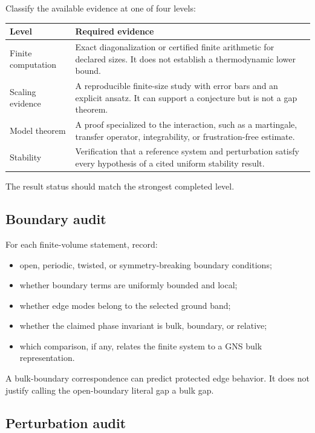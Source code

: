 \documentclass[12pt]{article}
\theoremstyle{definition}
\theoremstyle{remark}
\begin{document}
Classify the available evidence at one of four levels:

\begin{center}
\begin{tabular}{p{}p{}}
\toprule
Level & Required evidence \\
\midrule
Finite computation
& Exact diagonalization or certified finite arithmetic for declared sizes. It
does not establish a thermodynamic lower bound.\\[4pt]
Scaling evidence
& A reproducible finite-size study with error bars and an explicit ansatz. It
can support a conjecture but is not a gap theorem.\\[4pt]
Model theorem
& A proof specialized to the interaction, such as a martingale, transfer
operator, integrability, or frustration-free estimate.\\[4pt]
Stability
& Verification that a reference system and perturbation satisfy every
hypothesis of a cited uniform stability result.\\
\bottomrule
\end{tabular}
\end{center}

The result status should match the strongest completed level.

\subsection{Boundary audit}

For each finite-volume statement, record:

\begin{itemize}
  \item open, periodic, twisted, or symmetry-breaking boundary conditions;
  \item whether boundary terms are uniformly bounded and local;
  \item whether edge modes belong to the selected ground band;
  \item whether the claimed phase invariant is bulk, boundary, or relative;
  \item which comparison, if any, relates the finite system to a GNS bulk
  representation.
\end{itemize}

A bulk-boundary correspondence can predict protected edge behavior. It does
not justify calling the open-boundary literal gap a bulk gap.

\subsection{Perturbation audit}
\end{document}

